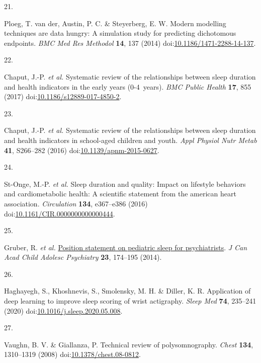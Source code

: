 \documentclass[
  9pt,
]{article}
\newlength{\cslhangindent}
\newlength{\csllabelwidth}
\newlength{\cslentryspacingunit} %
\newenvironment{CSLReferences}[2] %
 {%
  \setlength{\parindent}{0pt}
  \ifodd #1
  \let\oldpar\par
  \def\par{\hangindent=\cslhangindent\oldpar}
  \fi
  \setlength{\parskip}{#2\cslentryspacingunit}
 }%
 {}
\newcommand{\CSLLeftMargin}[1]{\parbox[t]{\csllabelwidth}{#1}}
\newcommand{\CSLRightInline}[1]{\parbox[t]{\linewidth - \csllabelwidth}{#1}\break}
\begin{document}
\begin{CSLReferences}{0}{0}
\leavevmode{}%
\CSLLeftMargin{21. }%
\CSLRightInline{Ploeg, T. van der, Austin, P. C. \& Steyerberg, E. W.
Modern modelling techniques are data hungry: A simulation study for
predicting dichotomous endpoints. \emph{{BMC} Med Res Methodol}
\textbf{14}, 137 (2014)
doi:\href{https://doi.org/10.1186/1471-2288-14-137}{10.1186/1471-2288-14-137}.}

\leavevmode{}%
\CSLLeftMargin{22. }%
\CSLRightInline{Chaput, J.-P. \emph{et al.} Systematic review of the
relationships between sleep duration and health indicators in the early
years (0-4~years). \emph{{BMC} Public Health} \textbf{17}, 855 (2017)
doi:\href{https://doi.org/10.1186/s12889-017-4850-2}{10.1186/s12889-017-4850-2}.}

\leavevmode{}%
\CSLLeftMargin{23. }%
\CSLRightInline{Chaput, J.-P. \emph{et al.} Systematic review of the
relationships between sleep duration and health indicators in
school-aged children and youth. \emph{Appl Physiol Nutr Metab}
\textbf{41}, S266--282 (2016)
doi:\href{https://doi.org/10.1139/apnm-2015-0627}{10.1139/apnm-2015-0627}.}

\leavevmode{}%
\CSLLeftMargin{24. }%
\CSLRightInline{St-Onge, M.-P. \emph{et al.} Sleep duration and quality:
Impact on lifestyle behaviors and cardiometabolic health: A scientific
statement from the american heart association. \emph{Circulation}
\textbf{134}, e367--e386 (2016)
doi:\href{https://doi.org/10.1161/CIR.0000000000000444}{10.1161/CIR.0000000000000444}.}

\leavevmode{}%
\CSLLeftMargin{25. }%
\CSLRightInline{Gruber, R. \emph{et al.}
\href{https://www.ncbi.nlm.nih.gov/pmc/articles/PMC4197518}{Position
statement on pediatric sleep for psychiatrists}. \emph{J Can Acad Child
Adolesc Psychiatry} \textbf{23}, 174--195 (2014).}

\leavevmode{}%
\CSLLeftMargin{26. }%
\CSLRightInline{Haghayegh, S., Khoshnevis, S., Smolensky, M. H. \&
Diller, K. R. Application of deep learning to improve sleep scoring of
wrist actigraphy. \emph{Sleep Med} \textbf{74}, 235--241 (2020)
doi:\href{https://doi.org/10.1016/j.sleep.2020.05.008}{10.1016/j.sleep.2020.05.008}.}

\leavevmode{}%
\CSLLeftMargin{27. }%
\CSLRightInline{Vaughn, B. V. \& Giallanza, P. Technical review of
polysomnography. \emph{Chest} \textbf{134}, 1310--1319 (2008)
doi:\href{https://doi.org/10.1378/chest.08-0812}{10.1378/chest.08-0812}.}


\end{CSLReferences}
\end{document}

